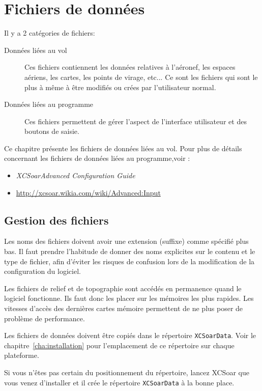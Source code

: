 \chapter{Fichiers de données}\label{cha:data-files}

Il y a 2 catégories de fichiers:
\begin{description}
\item[Données liées au vol]  Ces fichiers contiennent les données relatives à l'aéronef, les espaces aériens, les cartes, les points de virage, etc... Ce sont les fichiers qui sont le plus à même à être modifiés ou crées par l'utilisateur normal.
\item[Données liées au programme]  Ces fichiers permettent de gérer l'aspect de l'interface utilisateur et des boutons de saisie.
\end{description}
Ce chapitre présente les fichiers de données liées au vol. Pour plus de détails concernant les fichiers de données liées au  programme,voir :
\begin{itemize}
\item {\em XCSoarAdvanced Configuration Guide}
\item {\href{http://xcsoar.wikia.com/wiki/Advanced:Input}{http://xcsoar.wikia.com/wiki/Advanced:Input}}
\end{itemize}


\section{Gestion des fichiers}

Les noms des fichiers doivent avoir une extension (suffixe) comme spécifié plus bas. Il faut prendre l'habitude de donner des noms explicites sur le contenu et le type de fichier, afin d'éviter les risques de confusion lors de la modification de la configuration du logiciel.

Les fichiers de relief et de topographie sont accédés en permanence quand le logiciel fonctionne. Ils faut donc les placer sur les mémoires les plus rapides. Les vitesses d'accès des dernières cartes mémoire permettent de ne plus poser de problème de performance. 

Les fichiers de données doivent être copiés dans le répertoire
\verb|XCSoarData|. Voir le chapitre~\ref{cha:installation} pour
l'emplacement de ce répertoire sur chaque plateforme.

Si vous n'êtes pas certain du positionnement du répertoire, lancez XCSoar que vous venez d'installer et il crée le répertoire \verb|XCSoarData| à la bonne place.

